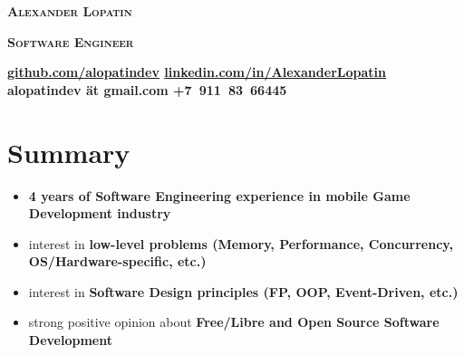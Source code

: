 \begin{center}
\fontsize{23pt}{15pt}\selectfont
\textsc{\lsstyle\bfseries Alexander Lopatin\mdseries}

\vspace{15pt}

\fontsize{18pt}{10pt}\selectfont
\textsc{\bfseries Software Engineer\mdseries}

\vspace{6pt}


\horizline

\vspace{0.1cm}

{
\bfseries
\fontsize{8pt}{8pt}\selectfont
\faGithub\hspace{0.1cm}\href{https://github.com/alopatindev?tab=repositories}{github.com/alopatindev}
\contactDelimiter\faLinkedinSquare\hspace{0.1cm}\href{https://www.linkedin.com/in/AlexanderLopatin}{linkedin.com/in/AlexanderLopatin}
\contactDelimiter\faEnvelope\hspace{0.1cm}alopatindev ät gmail.com
\contactDelimiter\faMobilePhone\hspace{0.1cm}+7~911~83~66445
\mdseries
}

\end{center}

\fontsize{11pt}{11.6pt}\selectfont

\section*{Summary}

\begin{itemize}[rightmargin=\dimexpr\linewidth-18cm-\leftmargin\relax]
    \item \bfseries 4 years \mdseries of Software Engineering experience in mobile Game Development industry
    \item interest in \bfseries low-level problems \mdseries (Memory, Performance, Concurrency, OS/Hardware-specific, etc.)
    \item interest in \bfseries Software Design \mdseries principles (FP, OOP, Event-Driven, etc.)
    \item strong positive opinion about \bfseries Free/Libre and Open Source \mdseries Software Development
\end{itemize}

